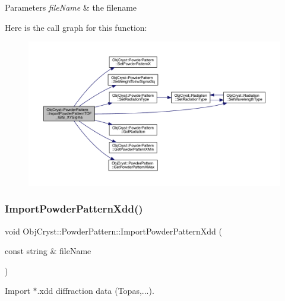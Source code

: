 \begin{DoxyParams}{Parameters}
{\em file\+Name} & the filename \\
\hline
\end{DoxyParams}
Here is the call graph for this function\+:
\nopagebreak
\begin{figure}[H]
\begin{center}
\leavevmode
\includegraphics[width=350pt]{class_obj_cryst_1_1_powder_pattern_a9d7209065acb5a992129cf6a2b14b526_cgraph}
\end{center}
\end{figure}
\mbox{\label{class_obj_cryst_1_1_powder_pattern_a4a8e1dc893c04a4451327d3f48f21d0e}} 
\subsubsection{\texorpdfstring{ImportPowderPatternXdd()}{ImportPowderPatternXdd()}}
{\footnotesize\ttfamily void Obj\+Cryst\+::\+Powder\+Pattern\+::\+Import\+Powder\+Pattern\+Xdd (\begin{DoxyParamCaption}\item[{const string \&}]{file\+Name }\end{DoxyParamCaption})}



Import $\ast$.xdd diffraction data (Topas,...). 


